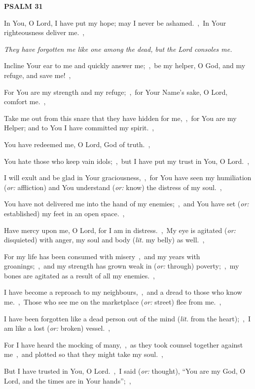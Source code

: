 \documentclass[12pt,twoside,a5paper]{article}
\newcommand{\psalm}[1]{\textbf{PSALM {#1}}\nopagebreak}
\newcommand{\qanona}[1]{{\liturgicalhint{Qanona.} \emph{#1}}}
\newcommand{\translationoption}[1]{\emph{or:} #1}
\newcommand{\translationliteral}[1]{\emph{lit.} #1}
\begin{document}
\psalm{31}

\begin{normalparskip}
  In You, O Lord, I have put my hope; may I never be ashamed.~\sep\ In Your righteousness deliver me.~\sep

  \qanona{They have forgotten me like one among the dead, but the Lord consoles me.}

  Incline Your ear to me and quickly answer me;~\sep\ be my helper, O God, and my refuge, and save me!~\sep

  For You are my strength and my refuge;~\sep\ for Your Name's sake, O Lord, comfort me.~\sep

  Take me out from this snare that they have hidden for me,~\sep\ for You are my Helper; and to You I have committed my spirit.~\sep

  You have redeemed me, O Lord, God of truth.~\sep

  You hate those who keep vain idols;~\sep\ but I have put my trust in You, O Lord.~\sep

  I will exult and be glad in Your graciousness,~\sep\ for You have seen my humiliation (\translationoption{affliction}) and You understand (\translationoption{know}) the distress of my soul.~\sep

  You have not delivered me into the hand of my enemies;~\sep\ and You have set (\translationoption{established}) my feet in an open space.~\sep

  Have mercy upon me, O Lord, for I am in distress.~\sep\ My eye is agitated (\translationoption{disquieted}) with anger, my soul and body (\translationliteral{my belly}) as well.~\sep

  For my life has been consumed with misery~\sep\ and my years with groanings;~\sep\ and my strength has grown weak in (\translationoption{through}) poverty;~\sep\ my bones are agitated as a result of all my enemies.~\sep

  I have become a reproach to my neighbours,~\sep\ and a dread to those who know me.~\sep\ Those who see me on the marketplace (\translationoption{street}) flee from me.~\sep

  I have been forgotten like a dead person out of the mind (\translationliteral{from the heart});~\sep\ I am like a lost (\translationoption{broken}) vessel.~\sep

  For I have heard the mocking of many,~\sep\ as they took counsel together against me~\sep\ and plotted so that they might take my soul.~\sep

  But I have trusted in You, O Lord.~\sep\ I said (\translationoption{thought}), ``You are my God, O Lord, and the times are in Your hands'';~\sep


\end{normalparskip}
\end{document}

